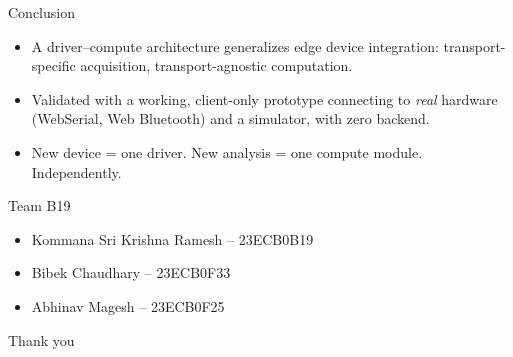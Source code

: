\documentclass{beamer}
\begin{document}
\begin{frame}{Conclusion}
\begin{itemize}
  \item A driver--compute architecture generalizes edge device integration: transport-specific
    acquisition, transport-agnostic computation.
  \item Validated with a working, client-only prototype connecting to \emph{real} hardware
    (WebSerial, Web Bluetooth) and a simulator, with zero backend.
  \item New device = one driver. New analysis = one compute module. Independently.
\end{itemize}
\end{frame}

\begin{frame}{Team B19}
\begin{itemize}
  \item Kommana Sri Krishna Ramesh -- 23ECB0B19
  \item Bibek Chaudhary -- 23ECB0F33
  \item Abhinav Magesh -- 23ECB0F25
\end{itemize}
\vspace{0.5cm}
\centering \Large Thank you
\end{frame}
\end{document}
